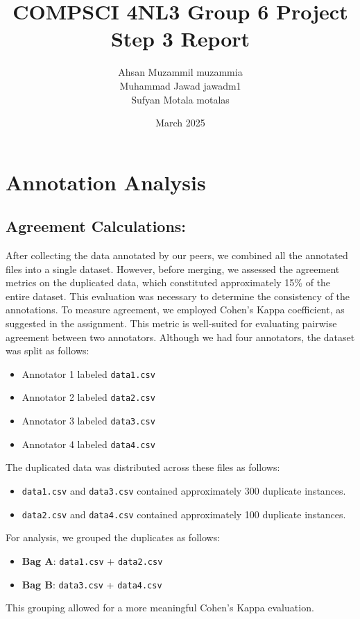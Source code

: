 \documentclass{article}
\title{COMPSCI 4NL3 Group 6 Project Step 3 Report}
\author{Ahsan Muzammil muzammia \\ Muhammad Jawad jawadm1 \\ Sufyan Motala motalas}
\date{March 2025}
\begin{document}
\maketitle

\newpage
\section*{Annotation Analysis}
\subsection*{Agreement Calculations:}

After collecting the data annotated by our peers, we combined all the annotated files into a single dataset. However, before merging, we assessed the agreement metrics on the duplicated data, which constituted approximately 15\% of the entire dataset. This evaluation was necessary to determine the consistency of the annotations.
\noindent
To measure agreement, we employed Cohen's Kappa coefficient, as suggested in the assignment. This metric is well-suited for evaluating pairwise agreement between two annotators. Although we had four annotators, the dataset was split as follows:

\begin{itemize}
    \item Annotator 1 labeled \texttt{data1.csv}
    \item Annotator 2 labeled \texttt{data2.csv}
    \item Annotator 3 labeled \texttt{data3.csv}
    \item Annotator 4 labeled \texttt{data4.csv}
\end{itemize}

The duplicated data was distributed across these files as follows:
\begin{itemize}
    \item \texttt{data1.csv} and \texttt{data3.csv} contained approximately 300 duplicate instances.
    \item \texttt{data2.csv} and \texttt{data4.csv} contained approximately 100 duplicate instances.
\end{itemize}

For analysis, we grouped the duplicates as follows:
\begin{itemize}
    \item \textbf{Bag A}: \texttt{data1.csv} + \texttt{data2.csv}
    \item \textbf{Bag B}: \texttt{data3.csv} + \texttt{data4.csv}
\end{itemize}
This grouping allowed for a more meaningful Cohen's Kappa evaluation.
\end{document}
